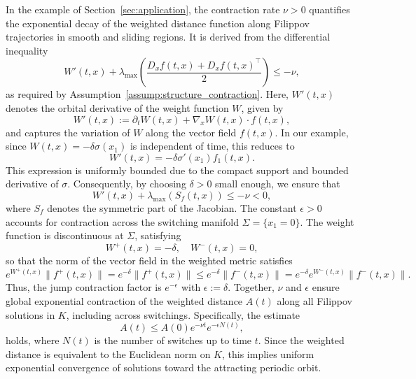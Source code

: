 \documentclass[11pt]{article}
\begin{document}
In the example of Section~\ref{sec:application}, the contraction rate \(\nu > 0\) quantifies the exponential decay of the weighted distance function along Filippov trajectories in smooth and sliding regions. It is derived from the differential inequality
	\[
	W'(t,x) + \lambda_{\max} \left( \frac{D_x f(t,x) + D_x f(t,x)^\top}{2} \right) \leq -\nu,
	\]
as required by Assumption~\ref{assump:structure_contraction}. Here, \(W'(t,x)\) denotes the orbital derivative of the weight function \(W\), given by
	\[
	W'(t,x) := \partial_t W(t,x) + \nabla_x W(t,x) \cdot f(t,x),
	\]
and captures the variation of \(W\) along the vector field \(f(t,x)\). In our example, since \(W(t,x) = -\delta \sigma(x_1)\) is independent of time, this reduces to
	\[
	W'(t,x) = -\delta \sigma'(x_1) f_1(t,x).
	\]
This expression is uniformly bounded due to the compact support and bounded derivative of \(\sigma\). Consequently, by choosing \(\delta > 0\) small enough, we ensure that
	\[
	W'(t,x) + \lambda_{\max}(S_f(t,x)) \leq -\nu < 0,
	\]
where \(S_f\) denotes the symmetric part of the Jacobian. The constant \(\epsilon > 0\) accounts for contraction across the switching manifold \(\Sigma = \{ x_1 = 0 \}\). The weight function is discontinuous at \(\Sigma\), satisfying
	\[
	W^+(t,x) = -\delta, \quad W^-(t,x) = 0,
	\]
so that the norm of the vector field in the weighted metric satisfies
	\[
	e^{W^+(t,x)} \|f^+(t,x)\| = e^{-\delta} \|f^+(t,x)\| \leq e^{-\delta} \|f^-(t,x)\| = e^{-\delta} e^{W^-(t,x)} \|f^-(t,x)\|.
	\]
Thus, the jump contraction factor is \(e^{-\epsilon}\) with \(\epsilon := \delta\). Together, \(\nu\) and \(\epsilon\) ensure global exponential contraction of the weighted distance \(A(t)\) along all Filippov solutions in \(K\), including across switchings. Specifically, the estimate
	\[
	A(t) \leq A(0) e^{-\nu t} e^{-\epsilon N(t)},
	\]
holds, where \(N(t)\) is the number of switches up to time \(t\). Since the weighted distance is equivalent to the Euclidean norm on \(K\), this implies uniform exponential convergence of solutions toward the attracting periodic orbit.

\
\end{document}
